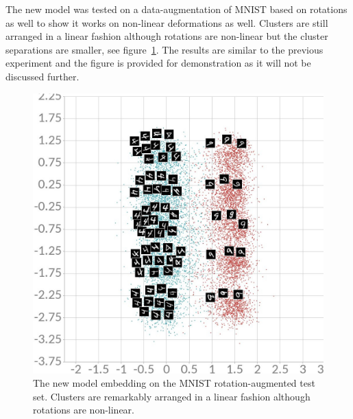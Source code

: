 \documentclass[a4paper,12pt]{report}
\begin{document}
The new model was tested on a data-augmentation of MNIST based on rotations as well to show it works on non-linear deformations as well.
Clusters are still arranged in a linear fashion although rotations are non-linear but the cluster separations are smaller, see figure~\ref{fig:mnist_cl2d_rotate}.
The results are similar to the previous experiment and the figure is provided for demonstration as it will not be discussed further.

\begin{figure}[h]
    \begin{center}
        \includegraphics{thesis_figures/mnist_cl2d_rotate.jpg}
    \end{center}
    \caption{The new model embedding on the MNIST rotation-augmented test set.
    Clusters are remarkably arranged in a linear fashion although rotations are non-linear.
    }
    \label{fig:mnist_cl2d_rotate}
\end{figure}
\end{document}
